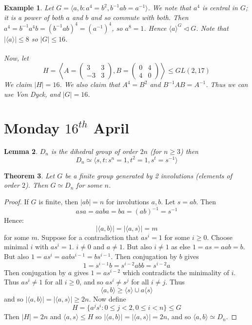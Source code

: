 \documentclass[a4paper,10pt]{article}
\newtheorem{thm}{Theorem}
\newtheorem{eg}[thm]{Example}
\newtheorem{Lem}[thm]{Lemma}
\begin{document}
\begin{eg}
Let $G = \langle a,b : a^4 = b^2, b^{-1} a b = a^{-1} \rangle$. We note that $a^4$ is central in $G$; it is a power of both $a$ and $b$ and so commute with both. Then $a^4 = b^{-1} a^4 b = (b^{-1} a b)^{4} = (a^{-1})^4$, so $a^8 = 1$. Hence $\langle a \rangle^G \triangleleft G$. Note that $|\langle a \rangle| \leq 8$ so $|G| \leq 16$. \\
\\
Now, let 
\[ H = \left\langle A = \begin{pmatrix} 3 & 3 \\ -3 & 3 \end{pmatrix}, B = \begin{pmatrix} 0 & 4 \\ 4 & 0 \end{pmatrix} \right\rangle \leq GL(2,17) \]
We claim $|H| = 16$. We also claim that $A^4 = B^2$ and $B^{-1} A B = A^{-1}$. Thus we can use Von Dyck, and $|G| = 16$. 
\end{eg}


\newpage
\section{Monday $16^{th}$ April}

\begin{Lem}
$D_n$ is the dihedral group of order $2n$ (for $n \geq 3$) then
\[ D_n \simeq \langle s,t : s^n = 1, t^2 = 1, s^t = s^{-1} \rangle \]

\end{Lem}

\begin{thm}
Let $G$ be a finite group generated by 2 involutions (elements of order $2$). Then $G \simeq D_n$ for some $n$. 
\end{thm}

\begin{proof}
If $G$ is finite, then $|ab| = n$ for involutions $a,b$. Let $s = ab$. Then
\[ asa = aaba = ba = (ab)^{-1} = s^{-1} \]
Hence:
\[ |\langle a,b \rangle| = |\langle a,s \rangle| = m \] for some $m$. Suppose for a contradiction that $as^i = 1$ for some $i \geq 0$. Choose minimal $i$ with $as^i = 1$. $i \neq 0$ and $a \neq 1$. But also $i \neq 1$ as else $1 = as = aab = b$. But also $1 = as^i = aabs^{i-1} = bs^{i-1}$. Then conjugation by $b$ gives
\[ 1 = s^{i-1}b = s^{i-2} a bb = s^{i-2} a \]
Then conjugation by $a$ gives $1  = as^{i-2}$ which contradicts the minimality of $i$. Thus $as^i \neq 1$ for all $i \geq 0$, and so $as^i \neq s^j$ for all $i \neq j$. Thus
\[ \langle a,b \rangle  \geq \langle s \rangle \cup a \langle s \rangle \]
and so $|\langle a,b \rangle | = |\langle a,s\rangle | \geq 2n$. Now define 
\[ H = \{ a^j s^i : 0 \leq j < 2, 0 \leq i < n \} \leq G \]
Then $|H| = 2n$ and $\langle a, s \rangle \leq H$ so $|\langle a,b \rangle| = |\langle a,s\rangle| = 2n$, and so $\langle a,b \rangle \simeq D_n$. 
\end{proof}
\end{document}
